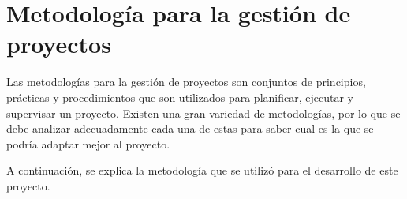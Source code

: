\section{Metodología para la gestión de proyectos}
Las metodologías para la gestión de proyectos son conjuntos de principios, prácticas y procedimientos que son utilizados para planificar, ejecutar y supervisar un proyecto. Existen una gran variedad de metodologías, por lo que se debe analizar adecuadamente cada una de estas para saber cual es la que se podría adaptar mejor al proyecto.

A continuación, se explica la metodología que se utilizó para el desarrollo de este proyecto.
    